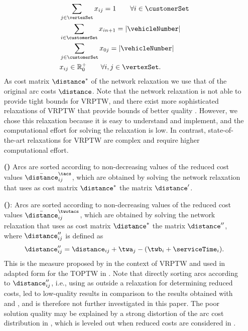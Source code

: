 \documentclass[11pt,a4paper,fleqn]{article}
\begin{document}
\begin{itemize}
\begin{align}
& \sum_{j \in \vertexSet} x_{ij} = 1 \qquad \forall i \in \customerSet \\
& \sum_{i \in \customerSet} x_{in+1} = |\vehicleNumber| \\
& \sum_{j \in \customerSet} x_{0j} = |\vehicleNumber| \\
& x_{ij} \in \mathbb{R}_0^+ \qquad \forall i, j \in \vertexSet\textrm{.}
\label{f:network_relaxation_flow}
\end{align}
As cost matrix $\mathbf{\distance^*}$ of the network relaxation we use that of the original arc costs $\mathbf{\distance}$. Note that the network relaxation is not able to provide tight bounds for VRPTW, and there exist more sophisticated relaxations of VRPTW that provide bounds of better quality \citep[see, e.g.][]{DesMR14}. However, we chose this relaxation because it is easy to understand and implement, and the computational effort for solving the relaxation is low. In contrast, state-of-the-art relaxations for VRPTW are complex and require higher computational effort. 
%
\item [\textbf{\nrtacf (\nrtacs)}] Arcs are sorted according to non-de\-creas\-ing values of the reduced cost values $\bar{\distance}_{ij}^{\mathit{\tacs}}$, which are obtained by solving the network relaxation that uses as cost matrix $\mathbf{\distance^*}$ the \tacs matrix $\mathbf{\distance'}$. 
%
\item[\textbf{\nrtwotacf (\nrtwotacs)}:] Arcs are sorted according to non-de\-creas\-ing values of the reduced cost values $\bar{\distance}_{ij}^{\mathit{\twotacs}}$, which are obtained by solving the network relaxation that uses as cost matrix $\mathbf{\distance^*}$ the matrix $\mathbf{\distance''}$, where $\distance''_{ij}$ is defined as
\begin{equation*} \distance''_{ij} = \distance_{ij} + \twa_j - (\twb_i + \serviceTime_i). \end{equation*}
This is the measure proposed by \citet{wc} in the context of VRPTW and used in adapted form for the TOPTW in \citet{labadie:12}. 
Note that directly sorting arcs according to $\distance''_{ij}$, i.e., using \twotacs as \standardSMS \sm outside a relaxation for determining reduced costs, led to low-quality results in comparison to the results obtained with \costs and \tacs, and is therefore not further investigated in this paper. The poor solution quality may be explained by a strong distortion of the arc cost distribution in \twotacs, which is leveled out when reduced costs are considered in \nrtwotacs.
\end{itemize}
\end{document}
